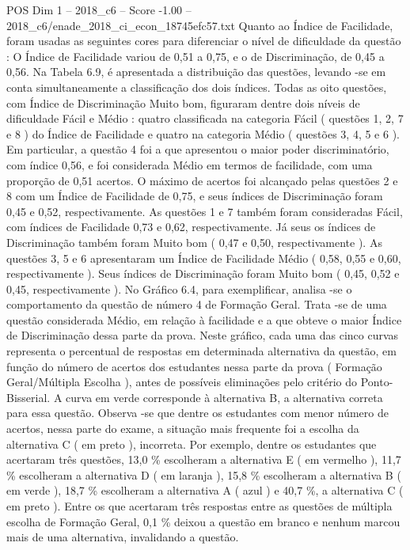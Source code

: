\begin{textsample}{POS Dim 1 – 2018\_c6 – Score -1.00 – 2018\_c6/enade\_2018\_ci\_econ\_18745efc57.txt}
Quanto ao Índice de Facilidade, foram usadas as seguintes cores para diferenciar o nível de dificuldade da questão : O Índice de Facilidade variou de 0,51 a 0,75, e o de Discriminação, de 0,45 a 0,56.
Na Tabela 6.9, é apresentada a distribuição das questões, levando -se em conta simultaneamente a classificação dos dois índices.
Todas as oito questões, com Índice de Discriminação Muito bom, figuraram dentre dois níveis de dificuldade Fácil e Médio : quatro classificada na categoria Fácil ( questões 1, 2, 7 e 8 ) do Índice de Facilidade e quatro na categoria Médio ( questões 3, 4, 5 e 6 ).
Em particular, a questão 4 foi a que apresentou o maior poder discriminatório, com índice 0,56, e foi considerada Médio em termos de facilidade, com uma proporção de 0,51 acertos.
O máximo de acertos foi alcançado pelas questões 2 e 8 com um Índice de Facilidade de 0,75, e seus índices de Discriminação foram 0,45 e 0,52, respectivamente.
As questões 1 e 7 também foram consideradas Fácil, com índices de Facilidade 0,73 e 0,62, respectivamente.
Já seus os índices de Discriminação também foram Muito bom ( 0,47 e 0,50, respectivamente ).
As questões 3, 5 e 6 apresentaram um Índice de Facilidade Médio ( 0,58, 0,55 e 0,60, respectivamente ).
Seus índices de Discriminação foram Muito bom ( 0,45, 0,52 e 0,45, respectivamente ).
No Gráfico 6.4, para exemplificar, analisa -se o comportamento da questão de número 4 de Formação Geral.
Trata -se de uma questão considerada Médio, em relação à facilidade e a que obteve o maior Índice de Discriminação dessa parte da prova.
Neste gráfico, cada uma das cinco curvas representa o percentual de respostas em determinada alternativa da questão, em função do número de acertos dos estudantes nessa parte da prova ( Formação Geral/Múltipla Escolha ), antes de possíveis eliminações pelo critério do Ponto-Bisserial.
A curva em verde corresponde à alternativa B, a alternativa correta para essa questão.
Observa -se que dentre os estudantes com menor número de acertos, nessa parte do exame, a situação mais frequente foi a escolha da alternativa C ( em preto ), incorreta.
Por exemplo, dentre os estudantes que acertaram três questões, 13,0 \% escolheram a alternativa E ( em vermelho ), 11,7 \% escolheram a alternativa D ( em laranja ), 15,8 \% escolheram a alternativa B ( em verde ), 18,7 \% escolheram a alternativa A ( azul ) e 40,7 \%, a alternativa C ( em preto ).
Entre os que acertaram três respostas entre as questões de múltipla escolha de Formação Geral, 0,1 \% deixou a questão em branco e nenhum marcou mais de uma alternativa, invalidando a questão.

\end{textsample}
